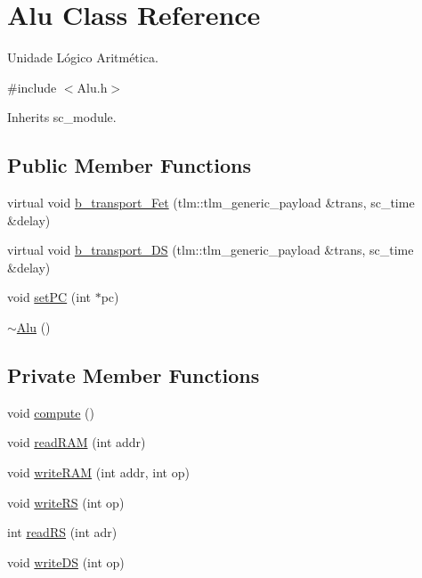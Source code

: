 \hypertarget{classAlu}{\section{Alu Class Reference}
\label{classAlu}
}


Unidade Lógico Aritmética.  




{\ttfamily \#include $<$Alu.\+h$>$}



Inherits sc\+\_\+module.

\subsection*{Public Member Functions}
\begin{DoxyCompactItemize}
\item 
virtual void \hyperlink{classAlu_ad8e186aac3201dc8a26cc61d7a90c5d2}{b\+\_\+transport\+\_\+\+Fet} (tlm\+::tlm\+\_\+generic\+\_\+payload \&trans, sc\+\_\+time \&delay)
\item 
virtual void \hyperlink{classAlu_ad0063f531b1036eee1226b784357417f}{b\+\_\+transport\+\_\+\+D\+S} (tlm\+::tlm\+\_\+generic\+\_\+payload \&trans, sc\+\_\+time \&delay)
\item 
void \hyperlink{classAlu_ab3a692120ec7c7a1b7625b8f601272a6}{set\+P\+C} (int $\ast$pc)
\item 
\hyperlink{classAlu_aab26dc9ed3cb4bdd1d13206f19a00552}{$\sim$\+Alu} ()
\end{DoxyCompactItemize}
\subsection*{Private Member Functions}
\begin{DoxyCompactItemize}
\item 
void \hyperlink{classAlu_a3fabfe3b33df17581f8bc85de9eddeea}{compute} ()
\item 
void \hyperlink{classAlu_a4e60e371ca0702c40add62c302f3d789}{read\+R\+A\+M} (int addr)
\item 
void \hyperlink{classAlu_aee7f8876c2ebe00f52e3bb55d8f86b73}{write\+R\+A\+M} (int addr, int op)
\item 
void \hyperlink{classAlu_a7cb11fb15cd17e7a37cae9c436a8c968}{write\+R\+S} (int op)
\item 
int \hyperlink{classAlu_a88462a0e8ffc8a1869368b48a45b73a9}{read\+R\+S} (int adr)
\item 
void \hyperlink{classAlu_ac880cb33f5bf380f392720b2a1a7f242}{write\+D\+S} (int op)
\end{DoxyCompactItemize}
